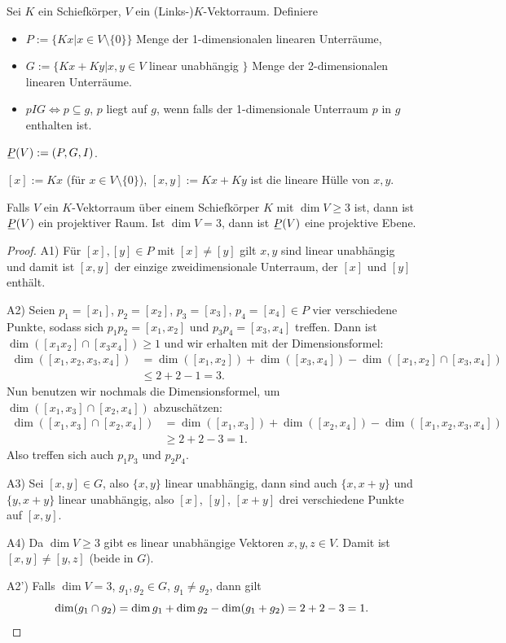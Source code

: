 Sei $K$ ein Schiefkörper, $V$ ein (Links-)$K$-Vektorraum. Definiere
\begin{itemize}
 \item $P := \{ Kx | x \in V \setminus \{ 0 \} \}$ Menge der 1-dimensionalen linearen Unterräume,
 \item $G := \{ Kx + Ky | x, y \in V $ linear unabhängig $\}$ Menge der 2-dimensionalen linearen Unterräume.
 \item $p I G \Leftrightarrow p \subseteq g$, $p$ liegt auf $g$, wenn falls der 1-dimensionale Unterraum $p$ in $g$ enthalten ist.
\end{itemize}

\begin{defn*}
 $\proj(V) := (P,G,I)$.
\end{defn*}

\begin{deno*}
 $[x] := Kx$ (für $x \in V \setminus \{ 0 \}$), $[x,y] := Kx + Ky$ ist die lineare Hülle von $x,y$.
\end{deno*}

\begin{thm}
 Falls $V$ ein $K$-Vektorraum über einem Schiefkörper $K$ mit $\dim V \ge 3$ ist, dann ist $\proj(V)$ ein projektiver Raum. Ist $\dim V = 3$, dann ist $\proj(V)$ eine projektive Ebene.
\end{thm}

\begin{proof}
 A1) Für $[x], [y] \in P$ mit $[x] \ne [y]$ gilt $x,y$ sind linear unabhängig und damit ist $[x,y]$ der einzige zweidimensionale Unterraum, der $[x]$ und $[y]$ enthält.
 
 A2) Seien $p_1 = [x_1]$, $p_2 = [x_2]$, $p_3 = [x_3]$, $p_4 = [x_4] \in P$ vier verschiedene Punkte, sodass sich $p_1 p_2 = [x_1, x_2]$ und $p_3 p_4 = [x_3, x_4]$ treffen. Dann ist $\dim ( [x_1 x_2] \cap [x_3 x_4] ) \ge 1$ und wir erhalten mit der Dimensionsformel:
 \begin{align*}
  \dim( [x_1, x_2, x_3, x_4]) &= \dim( [x_1, x_2] ) + \dim( [x_3, x_4] ) - \dim( [x_1,x_2] \cap [x_3,x_4] ) \\
  &\le 2+2-1 = 3.
 \end{align*}
 Nun benutzen wir nochmals die Dimensionsformel, um $\dim( [x_1,x_3] \cap [x_2,x_4] )$ abzuschätzen:
 \begin{align*}
  \dim( [x_1,x_3] \cap [x_2,x_4] ) &= \dim( [x_1, x_3] ) + \dim( [x_2, x_4] ) - \dim( [x_1, x_2, x_3, x_4]) \\
  &\ge 2 + 2 - 3 = 1.
 \end{align*}
 Also treffen sich auch $p_1 p_3$ und $p_2 p_4$.
 
 A3) Sei $[x,y] \in G$, also $\{ x,y \}$ linear unabhängig, dann sind auch $\{ x, x+y \}$ und $\{ y, x+y \}$ linear unabhängig, also $[x]$, $[y]$, $[x+y]$ drei verschiedene Punkte auf $[x,y]$.
 
 A4) Da $\dim V \ge 3$ gibt es linear unabhängige Vektoren $x,y,z \in V$. Damit ist $[x,y] \ne [y,z]$ (beide in $G$).
 
 A2') Falls $\dim V = 3$, $g_1, g_2 \in G$, $g_1 \ne g_2$, dann gilt 
 \[ \dim( g_1 \cap g_2 ) = \dim g_1 + \dim g_2 - \dim( g_1 + g_2 ) = 2 + 2 - 3 = 1. \qedhere \]
\end{proof}

